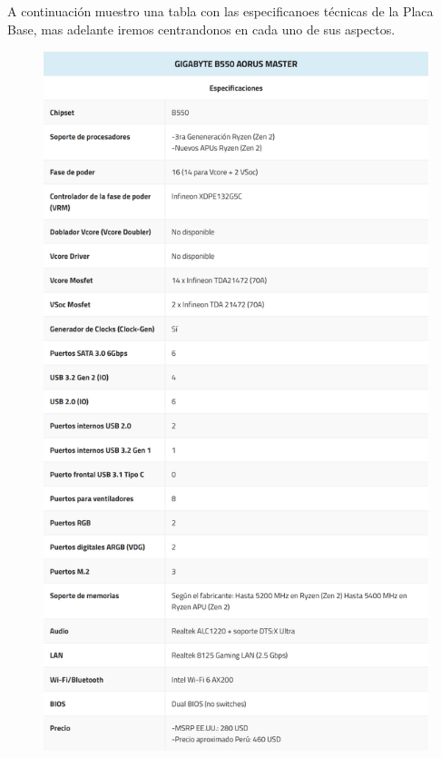 \documentclass{article}
\begin{document}
A continuación muestro una tabla con las especificanoes técnicas de la Placa Base, mas adelante iremos centrandonos en cada uno de sus aspectos.
\begin{figure}[h]
  \centering
  \includegraphics[scale = 0.21]{img/final_specs.png}
\end{figure}

\newpage
\end{document}

